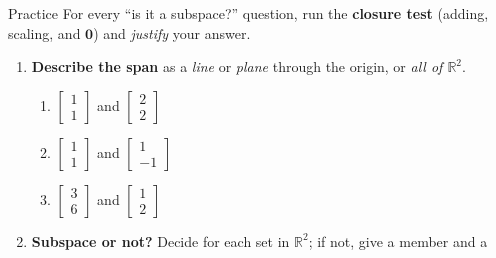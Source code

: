 \documentclass[10pt]{article}
\newcommand{\zero}{\mathbf{0}}
\begin{document}
\namedateperiod

\vspace{0.12in}

\begin{notesbox}{Practice}
For every ``is it a subspace?'' question, run the \textbf{closure test} (adding, scaling, and
$\zero$) and \emph{justify} your answer.

\begin{enumerate}[leftmargin=1.9em, itemsep=12pt]
  \item \textbf{Describe the span} as a \emph{line} or \emph{plane} through the origin, or
        \emph{all of $\mathbb{R}^2$}.
    \begin{enumerate}[label=(\alph*), leftmargin=1.8em, itemsep=4pt]
      \item $\begin{bmatrix} 1 \\ 1 \end{bmatrix}$ and $\begin{bmatrix} 2 \\ 2 \end{bmatrix}$ \hfill {}
      \item $\begin{bmatrix} 1 \\ 1 \end{bmatrix}$ and $\begin{bmatrix} 1 \\ -1 \end{bmatrix}$ \hfill {}
      \item $\begin{bmatrix} 3 \\ 6 \end{bmatrix}$ and $\begin{bmatrix} 1 \\ 2 \end{bmatrix}$ \hfill {}
    \end{enumerate}
  \item \textbf{Subspace or not?} Decide for each set in $\mathbb{R}^2$; if not, give a member and a

\end{enumerate}
\end{notesbox}
\end{document}
